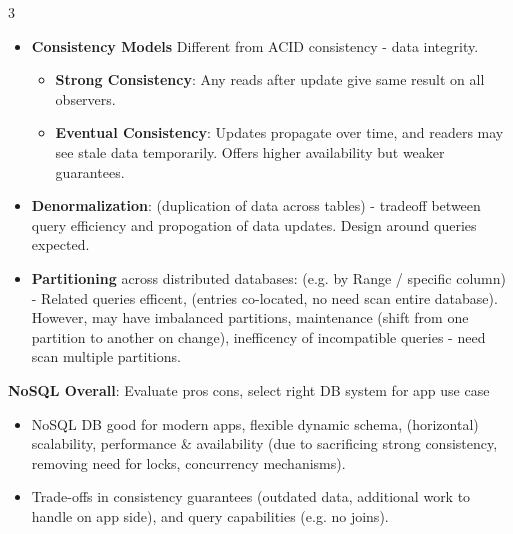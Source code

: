 \documentclass[a4paper, 9pt, landscape]{article}
\begin{document}
\begin{multicols*}{3}
\begin{itemize}
\item \textbf{Consistency Models} {\scriptsize Different from ACID consistency - data integrity.}
	\begin{itemize}
	\item \textbf{Strong Consistency}: Any reads after update give same result on all observers. 
	\item \textbf{Eventual Consistency}: Updates propagate over time, and readers may see stale data temporarily. Offers higher availability but weaker guarantees.
	\end{itemize}
\item \textbf{Denormalization}: (duplication of data across tables) - tradeoff between query efficiency and propogation of data updates. Design around queries expected.
\item \textbf{Partitioning} across distributed databases: (e.g. by Range / specific column) - Related queries efficent, (entries co-located, no need scan entire database). However, may have imbalanced partitions, maintenance (shift from one partition to another on change), inefficency of incompatible queries - need scan multiple partitions.
\end{itemize}

\textbf{NoSQL Overall}: {\scriptsize Evaluate pros cons, select right DB system for app use case}
\begin{itemize}
\item NoSQL DB good for modern apps, flexible dynamic schema, (horizontal) scalability, performance \& availability (due to sacrificing strong consistency, removing need for locks, concurrency mechanisms).
\item  Trade-offs in consistency guarantees (outdated data, additional work to handle on app side), and query capabilities (e.g. no joins).
\end{itemize}


\columnbreak


\end{multicols*}
\end{document}

